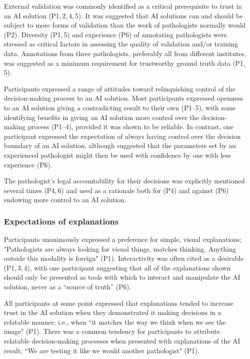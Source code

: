 \documentclass[final,5p,times,twocolumn,hyphens]{elsarticle}
\begin{document}
External validation was commonly identified as a critical prerequisite to trust in an AI solution (P1,\,2,\,4,\,5). It was suggested that AI solutions can and should be subject to more forms of validation than the work of pathologists normally would (P2). Diversity (P1,\,5) and experience (P6) of annotating pathologists were stressed as critical factors in assessing the quality of validation and/or training data. Annotations from three pathologists, preferably all from different institutes, was suggested as a minimum requirement for trustworthy ground truth data (P1,\,5).

Participants expressed a range of attitudes toward relinquishing control of the decision-making process to an AI solution. Most participants expressed openness to an AI solution giving a contradicting result to their own (P1--5), with some identifying benefits in giving an AI solution more control over the decision-making process (P1--4), provided it was shown to be reliable. In contrast, one participant expressed the expectation of always having control over the decision boundary of an AI solution, although suggested that the parameters set by an experienced pathologist might then be used with confidence by one with less experience (P6).

The pathologist's legal accountability for their decisions was explicitly mentioned several times (P4,\,6) and used as a rationale both for (P4) and against (P6) endowing more control to an AI solution. 

\subsubsection{Expectations of explanations}

Participants unanimously expressed a preference for simple, visual explanations; "Pathologists are always looking for visual things, matches thinking. Anything outside this modality is foreign" (P1).  Interactivity was often cited as a desirable (P1,\,3,\,4), with one participant suggesting that all of the explanations shown should only be presented as tools with which to interact and manipulate the AI solution, never as a ``source of truth'' (P6).

All participants at some point expressed that explanations tended to increase trust in the AI solution when they demonstrated it making decisions in a relatable manner; i.e., when ``it matches the way we  think when we see the image" (P1). There was a common tendency for participants to attribute relatable decision-making processes when presented with explanations of the AI result; ``We are testing it like we would another pathologist" (P1).
\end{document}
